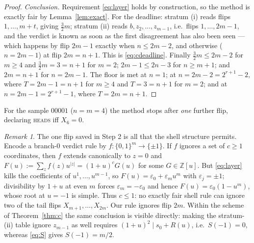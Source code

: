 \documentclass[11pt]{article}
\theoremstyle{remark}
\newtheorem*{remark}{Remark}
\newcommand{\head}{\textnormal{\textsc{heads}}}
\begin{document}
\begin{proof}
\emph{Conclusion.} Requirement \eqref{eq:layer} holds by construction, so the
method is exactly fair by Lemma~\ref{lem:exact}. For the deadline: stratum
(i) reads flips $1,\dots,m+t$, giving $\tfrac32m$; stratum (ii) reads
$b,z_2,\dots,z_{m-1}$, i.e.\ flips $1,\dots,2m-1$, and the verdict is known
as soon as the first disagreement has also been seen --- which happens by
flip $2m-1$ exactly when $n\le2m-2$, and otherwise ($n=2m-1$) at flip
$2m=n+1$. This is \eqref{eq:cdeadline}. Finally $\tfrac32m\le2m-2$ for
$m\ge4$ and $\tfrac32m=3=n+1$ for $m=2$; $2m-1\le2n-3$ for $n\ge m+1$; and
$2m=n+1$ for $n=2m-1$. The floor is met at $n=1$; at $n=2m-2=2^{r+1}-2$,
where $T=2m-1=n+1$ for $m\ge4$ and $T=3=n+1$ for $m=2$; and at
$n=2m-1=2^{r+1}-1$, where $T=2m=n+1$.
\end{proof}

For the sample $00001$ ($n=m=4$) the method stops after \emph{one} further
flip, declaring \head{} iff $X_6=0$.

\begin{remark}
The one flip saved in Step 2 is all that the shell structure permits. Encode
a branch-$0$ verdict rule by $f\colon\{0,1\}^m\to\{\pm1\}$. If $f$ ignores a
set of $c\ge1$ coordinates, then $f$ extends canonically to $z=0$ and
$F(u):=\sum_zf(z)u^{|z|}=(1+u)^cG(u)$ for some $G\in\mathbb Z[u]$. But
\eqref{eq:layer} kills the coefficients of $u^1,\dots,u^{m-1}$, so
$F(u)=\varepsilon_0+\varepsilon_mu^m$ with $\varepsilon_j=\pm1$; divisibility
by $1+u$ at even $m$ forces $\varepsilon_m=-\varepsilon_0$ and hence
$F(u)=\varepsilon_0(1-u^m)$, whose root at $u=-1$ is simple. Thus $c\le1$:
no exactly fair shell rule can ignore two of the tail flips
$X_{m+1},\dots,X_{2m}$. Our rule ignores flip $2m$. Within the scheme of
Theorem~\ref{thm:c} the same conclusion is visible directly: making the
stratum-(ii) table ignore $z_{m-1}$ as well requires
$(1+u)^2\mid s_0+R(u)$, i.e.\ $S(-1)=0$, whereas \eqref{eq:S} gives
$S(-1)=m/2$.
\end{remark}
\end{document}
